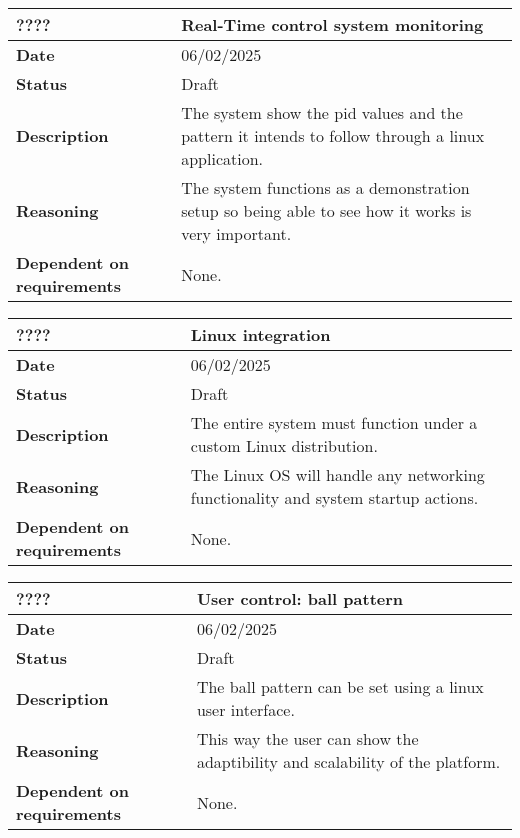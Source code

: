 \documentclass{article}
\begin{document}
\begin{table}[H]
    \renewcommand{\arraystretch}{1.3}
    \begin{tabular}{|l|p{10cm}|}
        \hline
        \rowcolor{gray!50}
        \textbf{????} & \textbf{Real-Time control system monitoring} \\ \hline
        \textbf{Date} & 06/02/2025 \\ \hline
        \textbf{Status} & Draft \\ \hline
        \textbf{Description} & The system show the pid values and the pattern it intends to follow through a linux application. \\ \hline
        \textbf{Reasoning} & The system functions as a demonstration setup so being able to see how it works is very important. \\ \hline
        \textbf{Dependent on requirements} & None. \\ \hline
    \end{tabular}
\end{table}

\begin{table}[H]
    \renewcommand{\arraystretch}{1.3}
    \begin{tabular}{|l|p{10cm}|}
        \hline
        \rowcolor{gray!50}
        \textbf{????} & \textbf{Linux integration} \\ \hline
        \textbf{Date} & 06/02/2025 \\ \hline
        \textbf{Status} & Draft \\ \hline
        \textbf{Description} & The entire system must function under a custom Linux distribution. \\ \hline
        \textbf{Reasoning} & The Linux OS will handle any networking functionality and system startup actions. \\ \hline
        \textbf{Dependent on requirements} & None. \\ \hline
    \end{tabular}
\end{table}

\begin{table}[H]
    \renewcommand{\arraystretch}{1.3}
    \begin{tabular}{|l|p{10cm}|}
        \hline
        \rowcolor{gray!50}
        \textbf{????} & \textbf{User control: ball pattern} \\ \hline
        \textbf{Date} & 06/02/2025 \\ \hline
        \textbf{Status} & Draft \\ \hline
        \textbf{Description} & The ball pattern can be set using a linux user interface.\\ \hline
        \textbf{Reasoning} & This way the user can show the adaptibility and scalability of the platform. \\ \hline
        \textbf{Dependent on requirements} & None. \\ \hline
    \end{tabular}
\end{table}
\end{document}
